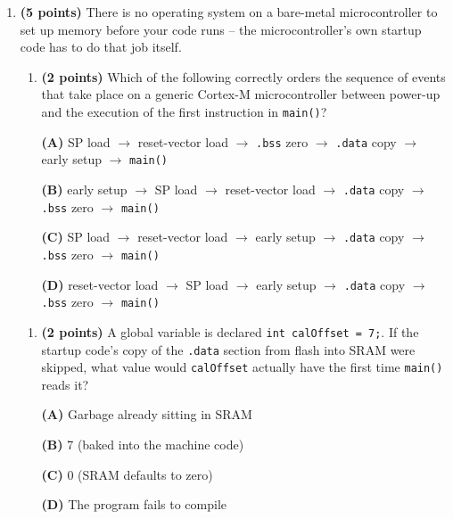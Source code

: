 \documentclass[20pt]{extarticle}
\begin{document}
\begin{enumerate}[label=\textbf{\arabic*.}, leftmargin=*, itemsep=2pt]

\item \textbf{(5 points)} There is no operating system on a bare-metal microcontroller to set up memory before your code runs -- the microcontroller's own startup code has to do that job itself.

\begin{enumerate}[label=(\alph*), leftmargin=*, itemsep=6pt]
\item \textbf{(2 points)} Which of the following correctly orders the sequence of events that take place on a generic Cortex-M microcontroller between power-up and the execution of the first instruction in \texttt{main()}?

\begin{center}
\textbf{(A)} SP load $\to$ reset-vector load $\to$ \texttt{.bss} zero $\to$ \texttt{.data} copy $\to$ early setup $\to$ \texttt{main()}

\textbf{(B)} early setup $\to$ SP load $\to$ reset-vector load $\to$ \texttt{.data} copy $\to$ \texttt{.bss} zero $\to$ \texttt{main()}

\textbf{(C)} SP load $\to$ reset-vector load $\to$ early setup $\to$ \texttt{.data} copy $\to$ \texttt{.bss} zero $\to$ \texttt{main()}

\textbf{(D)} reset-vector load $\to$ SP load $\to$ early setup $\to$ \texttt{.data} copy $\to$ \texttt{.bss} zero $\to$ \texttt{main()}
\end{center}
\end{enumerate}

\newpage

\begin{enumerate}[resume, label=(\alph*), leftmargin=*, itemsep=6pt]
\item \textbf{(2 points)} A global variable is declared \texttt{int calOffset = 7;}. If the startup code's copy of the \texttt{.data} section from flash into SRAM were skipped, what value would \texttt{calOffset} actually have the first time \texttt{main()} reads it?

\begin{center}
\textbf{(A)} Garbage already sitting in SRAM

\textbf{(B)} 7 (baked into the machine code)

\textbf{(C)} 0 (SRAM defaults to zero)

\textbf{(D)} The program fails to compile
\end{center}


\end{enumerate}
\end{enumerate}
\end{document}
